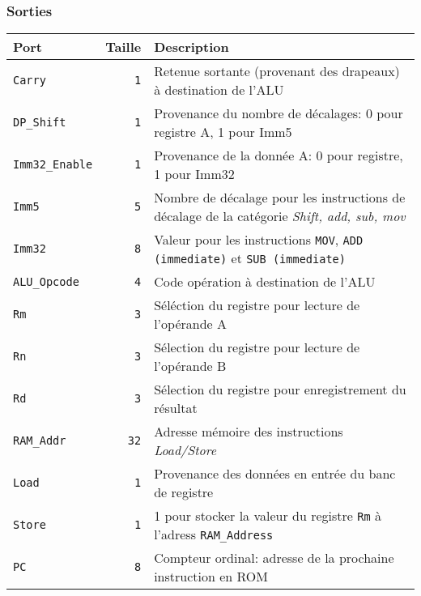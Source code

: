 \documentclass{article}
\begin{document}
    \subsubsection{Sorties}

    \begin{tabular}{|l|r|l|}
        \hline
        \textbf{Port}           & \textbf{Taille} & \textbf{Description}                                                                               \\
        \hline

        \hline
        \texttt{Carry}        & \texttt{1}      & Retenue sortante (provenant des drapeaux) à destination de l'ALU                                   \\
        \hline
        \texttt{DP\_Shift}     & \texttt{1}      & Provenance du nombre de décalages: 0 pour registre A, 1 pour Imm5                                  \\
        \hline
        \texttt{Imm32\_Enable} & \texttt{1}      & Provenance de la donnée A: 0 pour registre, 1 pour Imm32                                           \\
        \hline
        \texttt{Imm5}         & \texttt{5}      & Nombre de décalage pour les instructions de décalage de la catégorie \textit{Shift, add, sub, mov} \\
        \hline
        \texttt{Imm32}        & \texttt{8}      & Valeur pour les instructions \texttt{MOV}, \texttt{ADD (immediate)} et \texttt{SUB (immediate)}    \\
        \hline
        \texttt{ALU\_Opcode}   & \texttt{4}      & Code opération à destination de l'ALU                                                              \\
        \hline
        \texttt{Rm}           & \texttt{3}      & Séléction du registre pour lecture de l'opérande A                                                 \\
        \hline
        \texttt{Rn}           & \texttt{3}      & Sélection du registre pour lecture de l'opérande B                                                 \\
        \hline
        \texttt{Rd}           & \texttt{3}      & Sélection du registre pour enregistrement du résultat                                              \\
        \hline
        \texttt{RAM\_Addr}     & \texttt{32}     & Adresse mémoire des instructions \textit{Load/Store}                                               \\
        \hline
        \texttt{Load}         & \texttt{1}      & Provenance des données en entrée du banc de registre                                               \\
        \hline
        \texttt{Store}        & \texttt{1}      & 1 pour stocker la valeur du registre \texttt{Rm} à l'adress \texttt{RAM\_Address}                  \\
        \hline
        \texttt{PC}           & \texttt{8}      & Compteur ordinal: adresse de la prochaine instruction en ROM                                       \\



\end{tabular}
\end{document}

